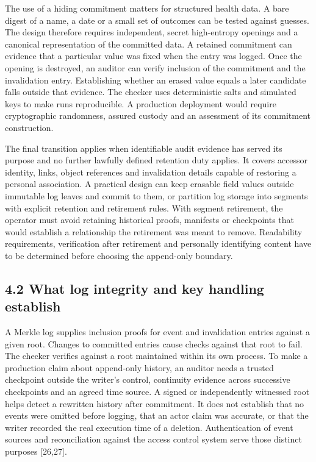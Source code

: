 \documentclass[5p,twocolumn]{elsarticle}
\begin{document}
The use of a hiding commitment matters for structured health data. A
bare digest of a name, a date or a small set of outcomes can be tested
against guesses. The design therefore requires independent, secret
high-entropy openings and a canonical representation of the committed
data. A retained commitment can evidence that a particular value was
fixed when the entry was logged. Once the opening is destroyed, an
auditor can verify inclusion of the commitment and the invalidation
entry. Establishing whether an erased value equals a later candidate
falls outside that evidence. The checker uses deterministic salts and
simulated keys to make runs reproducible. A production deployment would
require cryptographic randomness, assured custody and an assessment of
its commitment construction.

The final transition applies when identifiable audit evidence has served
its purpose and no further lawfully defined retention duty applies. It
covers accessor identity, links, object references and invalidation
details capable of restoring a personal association. A practical design
can keep erasable field values outside immutable log leaves and commit
to them, or partition log storage into segments with explicit retention
and retirement rules. With segment retirement, the operator must avoid
retaining historical proofs, manifests or checkpoints that would
establish a relationship the retirement was meant to remove. Readability
requirements, verification after retirement and personally identifying
content have to be determined before choosing the append-only boundary.

\hypertarget{what-log-integrity-and-key-handling-establish}{%
\subsection{4.2 What log integrity and key handling
establish}\label{what-log-integrity-and-key-handling-establish}}

A Merkle log supplies inclusion proofs for event and invalidation
entries against a given root. Changes to committed entries cause checks
against that root to fail. The checker verifies against a root
maintained within its own process. To make a production claim about
append-only history, an auditor needs a trusted checkpoint outside the
writer's control, continuity evidence across successive checkpoints and
an agreed time source. A signed or independently witnessed root helps
detect a rewritten history after commitment. It does not establish that
no events were omitted before logging, that an actor claim was accurate,
or that the writer recorded the real execution time of a deletion.
Authentication of event sources and reconciliation against the access
control system serve those distinct purposes {[}26,27{]}.
\end{document}
